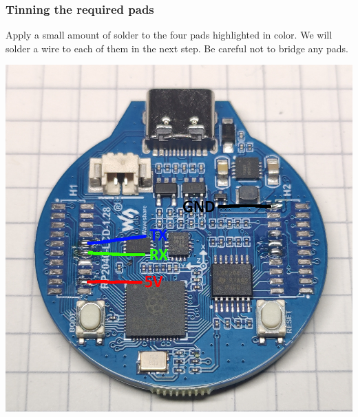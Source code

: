 \documentclass[]{article}
\begin{document}
\subsubsection{Tinning the required pads}
\begin{minipage}[t]{0.5\linewidth}
	\vspace{0pt}
	Apply a small amount of solder to the four pads highlighted in color. We will solder a wire to each of them in the next step. Be careful not to bridge any pads.
\end{minipage}
\hfill
\begin{minipage}[t]{0.4\linewidth}
	\vspace{0pt}
	\includegraphics[width=\linewidth]{images/01_displayunit/03_tin_display.jpg}
\end{minipage}
\end{document}
